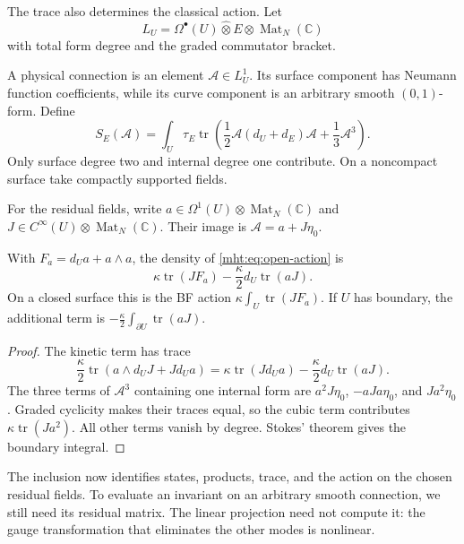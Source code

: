 The trace also determines the classical action. Let
\[
 L_U=\Omega^\bullet(U)\widehat\otimes E
                         \otimes\operatorname{Mat}_N(\mathbb C)
\]
with total form degree and the graded commutator bracket.

A physical connection is an element $\mathcal A\in L_U^1$.
Its surface component has Neumann function coefficients, while its
curve component is an arbitrary smooth $(0,1)$-form. Define
\begin{equation}\label{mht:eq:open-action}
 S_E(\mathcal A)=\int_U\tau_E\operatorname{tr}
 \left(\frac12\mathcal A(d_U+d_E)\mathcal A+\frac13\mathcal A^3\right).
\end{equation}
Only surface degree two and internal degree one contribute. On a
noncompact surface take compactly supported fields.

For the residual fields, write
$a\in\Omega^1(U)\otimes\operatorname{Mat}_N(\mathbb C)$ and
$J\in C^\infty(U)\otimes\operatorname{Mat}_N(\mathbb C)$.
Their image is $\mathcal A=a+J\eta_0$.

\begin{proposition}\label{mht:prop:bf-density}
With $F_a=d_Ua+a\wedge a$, the density of
\eqref{mht:eq:open-action} is
\[
 \kappa\operatorname{tr}(JF_a)
       -\frac{\kappa}{2}d_U\operatorname{tr}(aJ).
\]
On a closed surface this is the BF action
$\kappa\int_U\operatorname{tr}(JF_a)$. If $U$ has boundary, the
additional term is
$-\frac{\kappa}{2}\int_{\partial U}\operatorname{tr}(aJ)$.
\end{proposition}

\begin{proof}
The kinetic term has trace
\[
 \frac{\kappa}{2}\operatorname{tr}(a\wedge d_UJ+Jd_Ua)
 =\kappa\operatorname{tr}(Jd_Ua)
       -\frac{\kappa}{2}d_U\operatorname{tr}(aJ).
\]
The three terms of $\mathcal A^3$ containing one internal form are
$a^2J\eta_0$, $-aJa\eta_0$, and $Ja^2\eta_0$. Graded cyclicity makes
their traces equal, so the cubic term contributes
$\kappa\operatorname{tr}(Ja^2)$. All other terms vanish by degree.
Stokes' theorem gives the boundary integral.
\end{proof}

The inclusion now identifies states, products, trace, and the action on
the chosen residual fields. To evaluate an invariant on an arbitrary
smooth connection, we still need its residual matrix. The linear
projection need not compute it: the gauge transformation that eliminates
the other modes is nonlinear.
